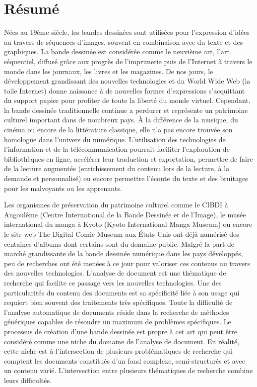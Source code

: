 \chapter*{R{\'e}sum{\'e}}

Nées au 19ème siècle, les bandes dessinées sont utilisées pour l'expression d'idées au travers de séquences d'images, souvent en combinaison avec du texte et des graphiques.
La bande dessinée est considérée comme le neuvième art, l'art séquentiel, diffusé grâce aux progrès de l'imprimerie puis de l'Internet à travers le monde dans les journaux, les livres et les magazines.
De nos jours, le développement grandissant des nouvelles technologies et du World Wide Web (la toile Internet) donne naissance à de nouvelles formes d'expressions s'acquittant du support papier pour profiter de toute la liberté du monde virtuel.
Cependant, la bande dessinée traditionnelle continue a perdurer et représente un patrimoine culturel important dans de nombreux pays.
À la différence de la musique, du cinéma ou encore de la littérature classique, elle n'a pas encore trouvée son homologue dans l'univers du numérique.
L'utilisation des technologies de l'information et de la télécommunication pourrait faciliter l'exploration de bibliothèques en ligne, accélérer leur traduction et exportation, permettre de faire de la lecture augmentée (enrichissement du contenu lors de la lecture, à la demande et personnalisé) ou encore permettre l'écoute du texte et des bruitages pour les malvoyants ou les apprenants.

Les organismes de préservation du patrimoine culturel comme le CIBDI à Angoulême (Centre International de la Bande Dessinée et de l'Image), le musée international du manga à Kyoto (Kyoto International Manga Museum) ou encore le site web The Digital Comic Museum aux États-Unis ont déjà numérisé des centaines d'albums dont certains sont du domaine public.
Malgré la part de marché grandissante de la bande dessinée numérique dans les pays développés, peu de recherches ont été menées à ce jour pour valoriser ces contenus au travers des nouvelles technologies.
L'analyse de document est une thématique de recherche qui facilite ce passage vers les nouvelles technologies.
Une des particularités du contenu des documents est sa spécificité liée à son usage qui requiert bien souvent des traitements très spécifiques.
Toute la difficulté de l'analyse automatique de documents réside dans la recherche de méthodes génériques capables de résoudre un maximum de problèmes spécifiques.
Le processus de création d'une bande dessinée est propre à cet art qui peut être considéré comme une niche du domaine de l'analyse de document.
En réalité, cette niche est à l'intersection de plusieurs problématiques de recherche qui comptent les documents constitués d'un fond complexe, semi-structurés et avec un contenu varié.
L'intersection entre plusieurs thématiques de recherche combine leurs difficultés.

